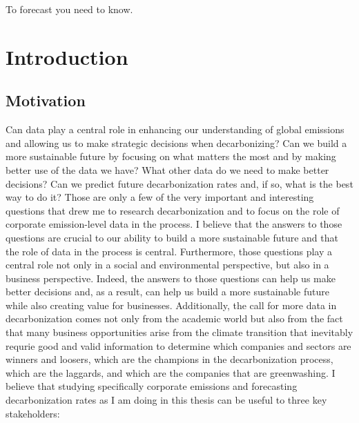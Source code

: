 \begin{savequote}[75mm]
To forecast you need to know. 
\end{savequote}

\chapter{Introduction}
\section{Motivation}
 Can data play a central role in enhancing our understanding of global emissions and allowing us to make strategic decisions when decarbonizing? Can we build a more sustainable future by focusing on what matters the most and by making better use of the data we have? What other data do we need to make better decisions? Can we predict future decarbonization rates and, if so, what is the best way to do it? Those are only a few of the very important and interesting questions that drew me to research decarbonization and to focus on the role of corporate emission-level data in the process. I believe that the answers to those questions are crucial to our ability to build a more sustainable future and that the role of data in the process is central. Furthermore, those questions play a central role not only in a social and environmental perspective, but also in a business perspective. Indeed, the answers to those questions can help us make better decisions and, as a result, can help us build a more sustainable future while also creating value for businesses. Additionally, the call for more data in decarbonization comes not only from the academic world but also from the fact that many business opportunities arise from the climate transition that inevitably requrie good and valid information to determine which companies and sectors are winners and loosers, which are the champions in the decarbonization process, which are the laggards, and which are the companies that are greenwashing. I believe that studying specifically corporate emissions and forecasting decarbonization rates as I am doing in this thesis can be useful to three key stakeholders: 
